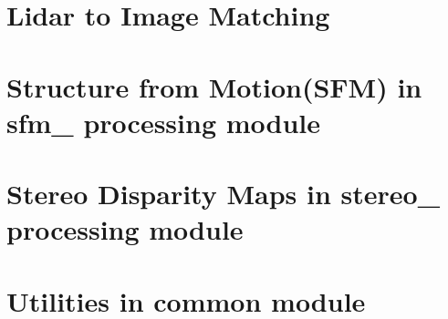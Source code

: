 \documentclass[12pt]{article}
\begin{document}
\section{Lidar to Image Matching }
\label{sec:lidar2img}

\section{Structure from Motion(SFM) in sfm\_ processing module}
\label{sec:sfm}

\section{Stereo Disparity Maps in stereo\_ processing module}
\label{sec:stereo}

\section{Utilities in common module}
\label{sec:common}

\end{document}
